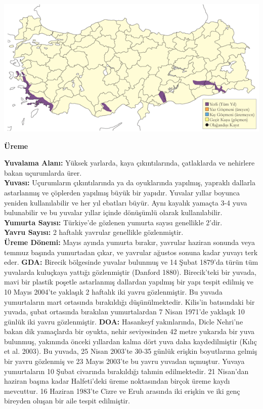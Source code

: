 \documentclass[
  letterpaper,
  DIV=11,
  numbers=noendperiod]{scrreprt}
\begin{document}
\includegraphics{images/harita_Page_097.png}

\textbf{Üreme}

\textbf{Yuvalama Alanı:} Yüksek yarlarda, kaya çıkıntılarında,
çatlaklarda ve nehirlere bakan uçurumlarda ürer.\\
\textbf{Yuvası:} Uçurumların çıkıntılarında ya da oyuklarında yapılmış,
yapraklı dallarla astarlanmış ve çöplerden yapılmış büyük bir yapıdır.
Yuvalar yıllar boyunca yeniden kullanılabilir ve her yıl ebatları büyür.
Aynı kayalık yamaçta 3-4 yuva bulunabilir ve bu yuvalar yıllar içinde
dönüşümlü olarak kullanılabilir.\\
\textbf{Yumurta Sayısı:} Türkiye'de gözlenen yumurta sayısı genellikle
2'dir.\\
\textbf{Yavru Sayısı:} 2 haftalık yavrular genellikle gözlenmiştir.\\
\textbf{Üreme Dönemi:} Mayıs ayında yumurta bırakır, yavrular haziran
sonunda veya temmuz başında yumurtadan çıkar, ve yavrular ağustos sonuna
kadar yuvayı terk eder. \textbf{GDA:} Birecik bölgesinde yuvalar
bulunmuş ve 14 Şubat 1879'da türün tüm yuvalarda kuluçkaya yattığı
gözlenmiştir (Danford 1880). Birecik'teki bir yuvada, mavi bir plastik
poşetle astarlanmış dallardan yapılmış bir yapı tespit edilmiş ve 10
Mayıs 2004'te yaklaşık 2 haftalık iki yavru gözlenmiştir. Bu yuvada
yumurtaların mart ortasında bırakıldığı düşünülmektedir. Kilis'in
batısındaki bir yuvada, şubat ortasında bırakılan yumurtalardan 7 Nisan
1971'de yaklaşık 10 günlük iki yavru gözlenmiştir. \textbf{DOA:}
Hasankeyf yakınlarında, Dicle Nehri'ne bakan dik yamaçlarda bir oyukta,
nehir seviyesinden 42 metre yukarıda bir yuva bulunmuş, yakınında önceki
yıllardan kalma dört yuva daha kaydedilmiştir (Kılıç et al. 2003). Bu
yuvada, 25 Nisan 2003'te 30-35 günlük erişkin boyutlarına gelmiş bir
yavru gözlenmiş ve 23 Mayıs 2003'te bu yavru yuvadan uçmuştur. Yuvaya
yumurtaların 10 Şubat civarında bırakıldığı tahmin edilmektedir. 21
Nisan'dan haziran başına kadar Halfeti'deki üreme noktasından birçok
üreme kaydı mevcuttur. 16 Haziran 1983'te Cizre ve Eruh arasında iki
erişkin ve iki genç bireyden oluşan bir aile tespit edilmiştir.
\end{document}
